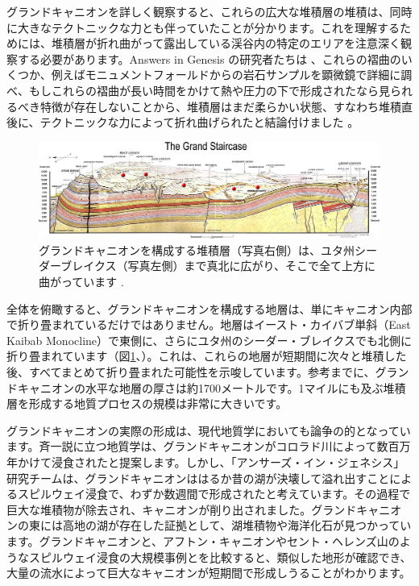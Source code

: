 \documentclass[10pt,twocolumn,letterpaper]{article}
\begin{document}
グランドキャニオンを詳しく観察すると、これらの広大な堆積層の堆積は、同時に大きなテクトニックな力とも伴っていたことが分かります。これを理解するためには、堆積層が折れ曲がって露出している渓谷内の特定のエリアを注意深く観察する必要があります。Answers in Genesis の研究者たちは \cite{42}、これらの褶曲のいくつか、例えばモニュメントフォールドからの岩石サンプルを顕微鏡で詳細に調べ、もしこれらの褶曲が長い時間をかけて熱や圧力の下で形成されたなら見られるべき特徴が存在しないことから、堆積層はまだ柔らかい状態、すなわち堆積直後に、テクトニックな力によって折れ曲げられたと結論付けました \cite{43}。

\begin{figure}
\begin{center}
\includegraphics[width=1\textwidth]{Grand_Staircase-big.jpg}
\end{center}
   \caption{グランドキャニオンを構成する堆積層（写真右側）は、ユタ州シーダーブレイクス（写真左側）まで真北に広がり、そこで全て上方に曲がっています \cite{50}.}
\label{fig:4}
\end{figure}
全体を俯瞰すると、グランドキャニオンを構成する地層は、単にキャニオン内部で折り畳まれているだけではありません。地層はイースト・カイバブ単斜（East Kaibab Monocline）で東側に、さらにユタ州のシーダー・ブレイクスでも北側に折り畳まれています（図\ref{fig:4}、\cite{46}）。これは、これらの地層が短期間に次々と堆積した後、すべてまとめて折り畳まれた可能性を示唆しています。参考までに、グランドキャニオンの水平な地層の厚さは約1700メートルです。1マイルにも及ぶ堆積層を形成する地質プロセスの規模は非常に大きいです。

グランドキャニオンの実際の形成は、現代地質学においても論争の的となっています。斉一説に立つ地質学は、グランドキャニオンがコロラド川によって数百万年かけて浸食されたと提案します\cite{47}。しかし、「アンサーズ・イン・ジェネシス」研究チームは、グランドキャニオンははるか昔の湖が決壊して溢れ出すことによるスピルウェイ浸食で、わずか数週間で形成されたと考えています。その過程で巨大な堆積物が除去され、キャニオンが削り出されました。グランドキャニオンの東には高地の湖が存在した証拠として、湖堆積物や海洋化石が見つかっています。グランドキャニオンと、アフトン・キャニオンやセント・ヘレンズ山のようなスピルウェイ浸食の大規模事例とを比較すると、類似した地形が確認でき、大量の流水によって巨大なキャニオンが短期間で形成しうることがわかります\cite{48}。
\end{document}

